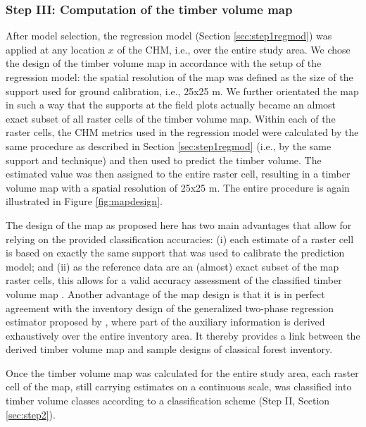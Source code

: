 \subsubsection{Step III: Computation of the timber volume map}
\label{sec:step3}

After model selection, the regression model (Section \ref{sec:step1regmod}) was applied at any location $x$ of the CHM, i.e., over the entire study area. We chose the design of the timber volume map in accordance with the setup of the regression model: the spatial resolution of the map was defined as the size of the support used for ground calibration, i.e., 25x25 m. We further orientated the map in such a way that the supports at the field plots actually became an almost exact subset of all raster cells of the timber volume map. Within each of the raster cells, the CHM metrics used in the regression model were calculated by the same procedure as described in Section \ref{sec:step1regmod} (i.e., by the same support and technique) and then used to predict the timber volume. The estimated value was then assigned to the entire raster cell, resulting in a timber volume map with a spatial resolution of 25x25 m. The entire procedure is again illustrated in Figure \ref{fig:mapdesign}.\par
The design of the map as proposed here has two main advantages that allow for relying on the provided classification accuracies: (i) each estimate of a raster cell is based on exactly the same support that was used to calibrate the prediction model; and (ii) as the reference data are an (almost) exact subset of the map raster cells, this allows for a valid accuracy assessment of the classified timber volume map \citep{congalton2008}. Another advantage of the map design is that it is in perfect agreement with the inventory design of the generalized two-phase regression estimator proposed by \citet{mandallaz2013b}, where part of the auxiliary information is derived exhaustively over the entire inventory area. It thereby provides a link between the derived timber volume map and sample designs of classical forest inventory.\par
Once the timber volume map was calculated for the entire study area, each raster cell of the map, still carrying estimates on a continuous scale, was classified into timber volume classes according to a classification scheme (Step II, Section \ref{sec:step2}).

